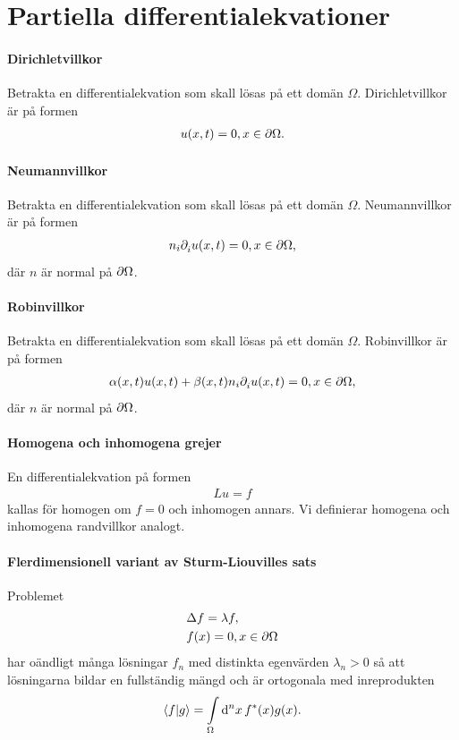 \section{Partiella differentialekvationer}

\paragraph{Dirichletvillkor}
Betrakta en differentialekvation som skall lösas på ett domän $\Omega$. Dirichletvillkor är på formen 
\begin{align*}
	u(x, t) = 0, x\in\partial \Omega.
\end{align*}

\paragraph{Neumannvillkor}
Betrakta en differentialekvation som skall lösas på ett domän $\Omega$. Neumannvillkor är på formen
\begin{align*}
	n_{i}\partial_{i}^{}u(x, t) = 0, x\in\partial \Omega,
\end{align*}
där $n$ är normal på $\partial \Omega$.

\paragraph{Robinvillkor}
Betrakta en differentialekvation som skall lösas på ett domän $\Omega$. Robinvillkor är på formen
\begin{align*}
	\alpha(x, t)u(x, t) + \beta(x, t)n_{i}\partial_{i}^{}u(x, t) = 0, x\in\partial \Omega,
\end{align*}
där $n$ är normal på $\partial \Omega$.

\paragraph{Homogena och inhomogena grejer}
En differentialekvation på formen
\begin{align*}
	Lu = f
\end{align*}
kallas för homogen om $f = 0$ och inhomogen annars. Vi definierar homogena och inhomogena randvillkor analogt.

\paragraph{Flerdimensionell variant av Sturm-Liouvilles sats}
Problemet
\begin{align*}
	&\Delta f = \lambda f, \\
	&f(x) = 0, x\in\partial \Omega
\end{align*}
har oändligt många lösningar $f_{n}$ med distinkta egenvärden $\lambda_{n} > 0$ så att lösningarna bildar en fullständig mängd och är ortogonala med inreprodukten
\begin{align*}
	\bra{f}\ket{g} = \int\limits_{\Omega}\dd[n]{x}f^{*}(x)g(x).
\end{align*}

